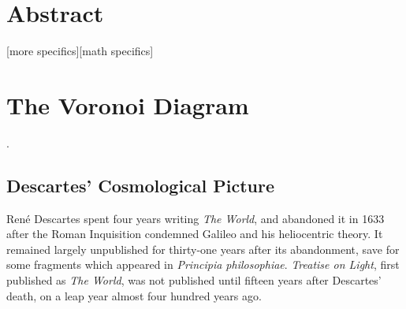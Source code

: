 \documentclass[12pt,twoside]{reedthesis}
\begin{document}
    \tableofcontents
    \listofalgorithms
    \listoffigures

    \chapter*{Abstract}
    [more specifics][math specifics]
	

  \mainmatter %
  \pagestyle{fancyplain} %

  \chapter*{The Voronoi Diagram}
    \setcounter{chapter}{1}
    \setcounter{section}{0}

  \citep[][p. 21]{descartes}.

  \section{Descartes' Cosmological Picture} %
  \label{sec:the_world}
    Ren\'{e} Descartes spent four years writing \emph{The World}, and abandoned it in 1633 after the Roman Inquisition condemned Galileo and his heliocentric theory. It remained largely unpublished for thirty-one years after its abandonment, save for some fragments which appeared in \emph{Principia philosophiae}. \emph{Treatise on Light}, first published as \emph{The World}, was not published until fifteen years after Descartes' death, on a leap year almost four hundred years ago. \par
\end{document}

